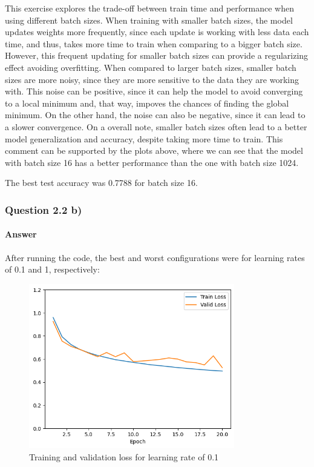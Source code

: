 \documentclass{article}
\begin{document}
This exercise explores the trade-off between train time and performance when using different batch sizes. When training with smaller batch sizes, the model updates weights more frequently,
since each update is working with less data each time, and thus, takes more time to train when comparing to a bigger batch size. However, this frequent updating for smaller batch sizes can 
provide a regularizing effect avoiding overfitting. When compared to larger batch sizes, smaller batch sizes are more noisy, since they are more sensitive to the data they are working with. This noise can be positive, since it can help the model
to avoid converging to a local minimum and, that way, impoves the chances of finding the global minimum. On the other hand, the noise can also be negative, since it can lead to a slower convergence. On a overall note, smaller batch sizes often lead to a better 
model generalization and accuracy, despite taking more time to train. This comment can be supported by the plots above, where we can see that the model with batch size 16 has a better performance than the one with batch size 1024.

The best test accuracy was 0.7788 for batch size 16.

\subsubsection{Question 2.2 b)}
\paragraph{Answer} After running the code, the best and worst configurations were for learning rates of 0.1 and 1, respectively:

\begin{figure}[H]
    \centering
    \includegraphics[width=0.8\textwidth]{"plots/mlp-training-loss-batch-16-lr-0.1-epochs-20-hidden-200-dropout-0.0-l2-0-layers-2-act-relu-opt-sgd.png"}
    \caption{Training and validation loss for learning rate of 0.1}
    \label{2.2b learning rate 0.1}
\end{figure}
\end{document}
